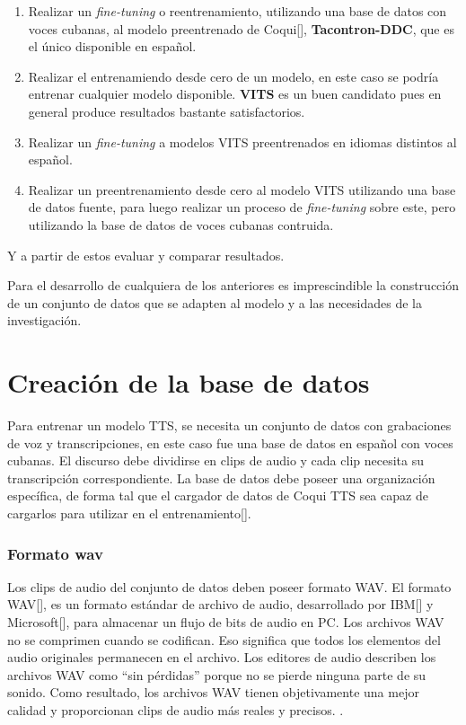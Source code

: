 \begin{enumerate}
	\item Realizar un \textit{fine-tuning} o reentrenamiento, utilizando una base de datos con voces cubanas, al modelo preentrenado de Coqui[\cite{coqui-doc}], \textbf{Tacontron-DDC}, que es el único disponible en español. 
	
	\item Realizar el entrenamiendo desde cero de un modelo, en este caso se podría entrenar cualquier modelo disponible. \textbf{VITS} es un buen candidato pues en general produce resultados bastante satisfactorios.
	
	\item Realizar un \textit{fine-tuning} a modelos VITS preentrenados en idiomas distintos al español.
	
	\item Realizar un preentrenamiento desde cero al modelo VITS utilizando una base de datos fuente, para luego realizar un proceso de \textit{fine-tuning} sobre este, pero utilizando la base de datos de voces cubanas contruida.
	
	
	
\end{enumerate}

Y a partir de estos evaluar y comparar resultados.

Para el desarrollo de cualquiera de los anteriores es imprescindible la construcción de un conjunto de datos que se adapten al modelo y a las necesidades de la investigación.


\section{Creación de la base de datos} \label{db}

Para entrenar un modelo TTS, se necesita un conjunto de datos con grabaciones de voz y transcripciones, en este caso fue una base de datos en español con voces cubanas. El discurso debe dividirse en clips de audio y cada clip necesita su transcripción correspondiente. La base de datos debe poseer una organización específica, de forma tal que el cargador de datos de Coqui TTS sea capaz de cargarlos para utilizar en el entrenamiento[\cite{formatting-dataset}].    

\subsubsection{Formato wav}
Los clips de audio del conjunto de datos deben poseer formato WAV. El formato WAV[\cite{wav}], es un formato estándar de archivo de audio, desarrollado por IBM[\cite{ibm}] y Microsoft[\cite{microsoft}], para almacenar un flujo de bits de audio en PC. Los archivos WAV no se comprimen cuando se codifican. Eso significa que todos los elementos del audio originales permanecen en el archivo. Los editores de audio describen los archivos WAV como ``sin pérdidas'' porque no se pierde ninguna parte de su sonido. Como resultado, los archivos WAV tienen objetivamente una mejor calidad y proporcionan clips de audio más reales y precisos. .


